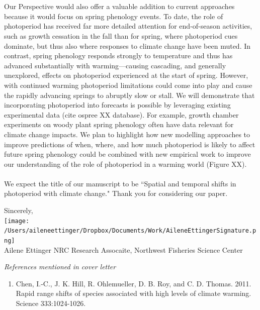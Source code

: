 \documentclass[11pt,a4paper]{letter}
\begin{document}
\begin{letter}{}
\\
\\
Our Perspective would also offer a valuable addition to current approaches because it would focus on spring phenology events. To date, the role of photoperiod has received far more detailed attention for end-of-season activities, such as growth cessation in the fall than for spring, where photoperiod cues dominate, but thus also where responses to climate change have been muted. In contrast, spring phenology responds strongly to temperature and thus has advanced substantially with warming---causing cascading, and generally unexplored, effects on photoperiod experienced at the start of spring. However, with continued warming photoperiod limitations could come into play and cause the rapidly advancing springs to abruptly slow or stall. We will demonstrate that incorporating photoperiod into forecasts is possible by leveraging existing experimental data (cite ospree XX database). For example, growth chamber experiments on woody plant spring phenology often have data relevant for climate change impacts. We plan to highlight how new modelling approaches to improve predictions of when, where, and how much photoperiod is likely to affect future spring phenology could be combined with new empirical work to improve our understanding of the role of photoperiod in a warming world (Figure XX). %
\\
\\
We expect the title of our manuscript to be ``Spatial and temporal shifts in photoperiod with climate change."  Thank you for considering our paper.

Sincerely,\\

\texttt{[image: /Users/aileneettinger/Dropbox/Documents/Work/AileneEttingerSignature.png]} \\
Ailene Ettinger
NRC Research Assocaite, Northwest Fisheries Science Center

\noindent \emph{References mentioned in cover letter}
\begin{footnotesize}
\begin{enumerate}
\item Chen, I.-C., J. K. Hill, R. Ohlemueller, D. B. Roy, and C. D. Thomas. 2011. Rapid range shifts of species associated with high levels of climate warming. Science 333:1024-1026.


\end{enumerate}
\end{footnotesize}
\end{letter}
\end{document}
